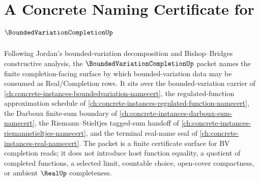 \chapter{A Concrete Naming Certificate for $\BoundedVariationCompletionUp$}
\label{ch:concrete-instances-bounded-variation-completion-namecert}

Following Jordan's bounded-variation decomposition and Bishop--Bridges constructive analysis, the $\BoundedVariationCompletionUp$ packet names the finite completion-facing surface by which bounded-variation data may be consumed as Real/Completion rows. It sits over the bounded-variation carrier of \autoref{ch:concrete-instances-boundedvariation-namecert}, the regulated-function approximation schedule of \autoref{ch:concrete-instances-regulated-function-namecert}, the Darboux finite-sum boundary of \autoref{ch:concrete-instances-darboux-sum-namecert}, the Riemann--Stieltjes tagged-sum handoff of \autoref{ch:concrete-instances-riemannstieltjes-namecert}, and the terminal real-name seal of \autoref{ch:concrete-instances-real-namecert}. The packet is a finite certificate surface for BV completion reads; it does not introduce host function equality, a quotient of completed functions, a selected limit, countable choice, open-cover compactness, or ambient $\RealUp$ completeness.

